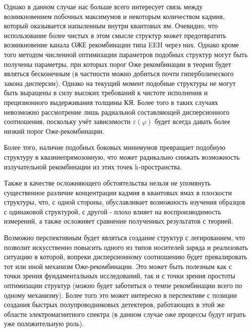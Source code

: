 \documentclass[../main.tex]{subfiles}
\begin{document}
    Однако в данном случае нас больше всего интересует связь между возникновением побочных максимумов и некоторым количеством 
    кадмия, который оказывается напыленным внутри квантовых ям. Очевидно, что использование более чистых в этом смысле структур
    может предотвратить возникновение канала ОЖЕ рекомбинации типа EEH через них. Однако кроме того методом численной оптимизации параметров 
    подобных структур могут быть получены параметры, при которых порог Оже рекомбинации в теории будет являться бесконечным (в частности можно добиться почти 
    гиперболического закона дисперсии). Однако на текущий момент подобные структуры не могут быть выращены в силу высоких требований к чистоте исполнения и 
    прецизионного выдерживания толщины КЯ. Более того в таких случаях невозможно рассмотрение лишь радиальной составляющей дисперсионного соотношения,
    поскольку учёт зависимости $\varepsilon(\varphi)$ будет всегда давать более низкий порог Оже-рекомбинации.

    Более того, наличие подобных боковых минимумов превращает подобную структуру в квазинепрямозонную, что может радикально снижать возможность излучательной 
    рекомбинации из этих точек k-пространства. 

    Также в качестве осложняющего обстоятельства нельзя не упомянуть существенное различие концентрации кадмия в квантовых ямах в плоскости структуры,
    что, с одной стороны, обуславливает возможность изучения образцов с одинаковой структурой, с другой - плохо влияет на воспроизводимость измерений,
    а также осложняет сравнение полученных результатов с теорией.

    Возможно перспективным будет являться создание структур с легированием, что позволит искусственно повысить одного из типов носителей заряда и реализовать 
    ситуацию в которой, вопреки дисперсионному соотношению будет превалировать тот или иной механизм Оже-рекомбинации. Это может быть полезным как с точки зрения 
    фундаментальных исследований, так и с точки зрения простоты оптимизации структур (можно будет заботиться о темпе рекомбинации всего по одному механизму). 
    Более того это может интересно в перспективе с позиции создания быстрых полупроводниковых детектеров, работающих в этой же области электромагнитного спектра 
    (в данном случае оже процессы будут играть уже положительную роль).
    \newpage
\end{document}
